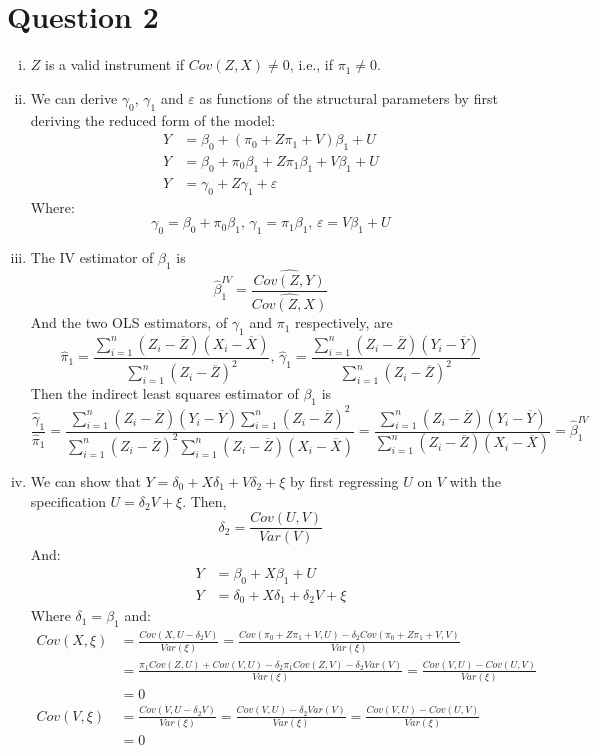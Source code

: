 \documentclass{article}
\newcommand{\sumn}{\sum_{i=1}^{n}}
\newcommand{\bhat}{\hat{\beta}}
\newcommand{\biv}{\bhat^{IV}}
\newcommand{\xbar}{\overline{X}}
\newcommand{\ybar}{\overline{Y}}
\newcommand{\zbar}{\overline{Z}}
\begin{document}
\pagebreak
\section*{Question 2}

\begin{enumerate}[(i)]
	\item $Z$ is a valid instrument if ${Cov(Z,X)\neq0}$, i.e., if ${\pi_1\neq 0}$.
	
	\item We can derive $\gamma_0$, $\gamma_1$ and $\varepsilon$ as functions of the structural parameters by first deriving the reduced form of the model:
		\begin{align*}
			Y &= \beta_0 + \left(\pi_0 + Z\pi_1 + V\right)\beta_1 + U 	\\
			Y &= \beta_0 + \pi_0\beta_1 + Z\pi_1\beta_1 + V\beta_1 + U 	\\
			Y &= \gamma_0 + Z\gamma_1 + \varepsilon
		\end{align*}
		Where:
		\[
			\gamma_0 = \beta_0 + \pi_0\beta_1\text{, }\gamma_1 = \pi_1\beta_1\text{, }\varepsilon = V\beta_1 + U
		\]
	
	\item The IV estimator of $\beta_1$ is $$ \biv_1 = \frac{\widehat{Cov(Z,Y)}}{\widehat{Cov(Z,X)}} $$ And the two OLS estimators, of $\gamma_1$ and $\pi_1$ respectively, are
		\[
			\hat{\pi}_1 = \frac{\sumn(Z_i-\zbar)(X_i-\xbar)}{\sumn(Z_i-\zbar)^2}\text{, }\hat{\gamma}_1 = \frac{\sumn(Z_i-\zbar)(Y_i-\ybar)}{\sumn(Z_i-\zbar)^2}
		\]
		Then the indirect least squares estimator of $\beta_1$ is 
		\[
			\frac{\hat{\gamma}_1}{\hat{\pi}_1} 	= \frac{\sumn(Z_i-\zbar)(Y_i-\ybar)\sumn(Z_i-\zbar)^2}{\sumn(Z_i-\zbar)^2\sumn(Z_i-\zbar)(X_i-\xbar)}
												= \frac{\sumn(Z_i-\zbar)(Y_i-\ybar)}{\sumn(Z_i-\zbar)(X_i-\xbar)} = \biv_1
		\]
	
	\item We can show that ${Y=\delta_0 + X\delta_1 + V\delta_2 + \xi}$ by first regressing $U$ on $V$ with the specification ${U = \delta_2V + \xi}$. Then, $$ \delta_2 = \frac{Cov(U,V)}{Var(V)}$$ And:
	\begin{align*}
		Y &= \beta_0 + X\beta_1 + U					\\
		Y &= \delta_0 + X\delta_1 + \delta_2V + \xi
	\end{align*}
	Where ${\delta_1=\beta_1}$ and:
	{\small
		\begin{align*}
			Cov(X,\xi) 	&= \frac{Cov(X,U-\delta_2V)}{Var(\xi)} = \frac{Cov(\pi_0 + Z\pi_1 + V,U)-\delta_2Cov(\pi_0 + Z\pi_1 + V,V)}{Var(\xi)}	\\
						&= \frac{\pi_1Cov(Z,U) +Cov(V,U)-\delta_2\pi_1Cov(Z,V)-\delta_2Var(V)}{Var(\xi)} = \frac{Cov(V,U)-Cov(U,V)}{Var(\xi)} 	\\
						&= 0																													\\
			Cov(V,\xi) 	&= \frac{Cov(V,U-\delta_2V)}{Var(\xi)} = \frac{Cov(V,U)-\delta_2Var(V)}{Var(\xi)} = \frac{Cov(V,U)-Cov(U,V)}{Var(\xi)}	\\
						&= 0
		\end{align*}
	}
	

\end{enumerate}
\end{document}
